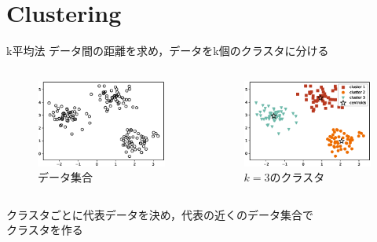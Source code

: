 \documentclass[dvipdfmx,platex]{beamer}
\begin{document}
\section{Clustering}
\begin{frame}{k平均法}
  データ間の距離を求め，データをk個のクラスタに分ける
  \begin{columns}[T,onlytextwidth]
    \begin{figure}
      \centering
      \includegraphics[width=5cm]{fig/cluster.eps}
      \caption{{\mgfamily データ集合}}
    \end{figure}
    \begin{figure}
      \centering
      \includegraphics[width=5cm]{fig/colored_scatter.eps}
      \caption{$k=3${\mgfamily のクラスタ}}
    \end{figure}
  \end{columns}
  クラスタごとに代表データを決め，代表の近くのデータ集合で\\クラスタを作る
\end{frame}
\end{document}
